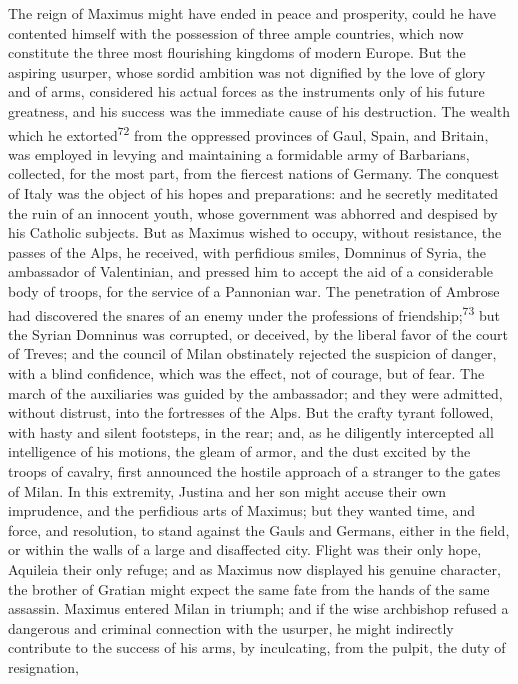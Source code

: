 The reign of Maximus might have ended in peace and prosperity,
could he have contented himself with the possession of three
ample countries, which now constitute the three most flourishing
kingdoms of modern Europe. But the aspiring usurper, whose sordid
ambition was not dignified by the love of glory and of arms,
considered his actual forces as the instruments only of his
future greatness, and his success was the immediate cause of his
destruction. The wealth which he extorted\textsuperscript{72} from the oppressed
provinces of Gaul, Spain, and Britain, was employed in levying
and maintaining a formidable army of Barbarians, collected, for
the most part, from the fiercest nations of Germany. The conquest
of Italy was the object of his hopes and preparations: and he
secretly meditated the ruin of an innocent youth, whose
government was abhorred and despised by his Catholic subjects.
But as Maximus wished to occupy, without resistance, the passes
of the Alps, he received, with perfidious smiles, Domninus of
Syria, the ambassador of Valentinian, and pressed him to accept
the aid of a considerable body of troops, for the service of a
Pannonian war. The penetration of Ambrose had discovered the
snares of an enemy under the professions of friendship;\textsuperscript{73} but
the Syrian Domninus was corrupted, or deceived, by the liberal
favor of the court of Treves; and the council of Milan
obstinately rejected the suspicion of danger, with a blind
confidence, which was the effect, not of courage, but of fear.
The march of the auxiliaries was guided by the ambassador; and
they were admitted, without distrust, into the fortresses of the
Alps. But the crafty tyrant followed, with hasty and silent
footsteps, in the rear; and, as he diligently intercepted all
intelligence of his motions, the gleam of armor, and the dust
excited by the troops of cavalry, first announced the hostile
approach of a stranger to the gates of Milan. In this extremity,
Justina and her son might accuse their own imprudence, and the
perfidious arts of Maximus; but they wanted time, and force, and
resolution, to stand against the Gauls and Germans, either in the
field, or within the walls of a large and disaffected city.
Flight was their only hope, Aquileia their only refuge; and as
Maximus now displayed his genuine character, the brother of
Gratian might expect the same fate from the hands of the same
assassin. Maximus entered Milan in triumph; and if the wise
archbishop refused a dangerous and criminal connection with the
usurper, he might indirectly contribute to the success of his
arms, by inculcating, from the pulpit, the duty of resignation,

